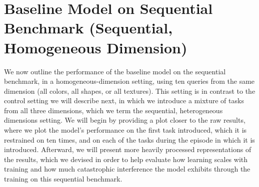 \FloatBarrier
\section{Baseline Model on Sequential Benchmark (Sequential, Homogeneous Dimension)}
We now outline the performance of the baseline model on the sequential benchmark, in a homogeneous-dimension setting, using ten queries from the same dimension (all colors, all shapes, or all textures). This setting is in contrast to the control setting we will describe next, in which we introduce a mixture of tasks from all three dimensions, which we term the sequential, heterogeneous dimensions setting. We will begin by providing a plot closer to the raw results, where we plot the model’s performance on the first task introduced, which it is restrained on ten times, and on each of the tasks during the episode in which it is introduced. Afterward, we will present more heavily processed representations of the results, which we devised in order to help evaluate how learning scales with training and how much catastrophic interference the model exhibits through the training on this sequential benchmark. 

